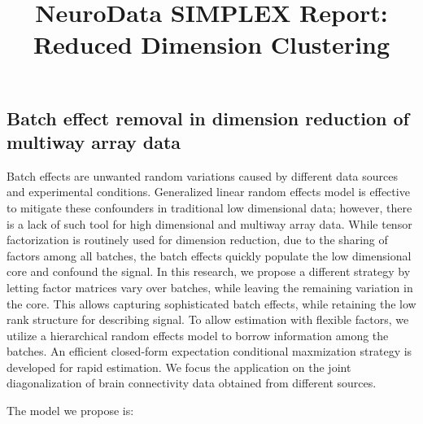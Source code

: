 \documentclass[simplex.tex]{subfiles}
\title{NeuroData SIMPLEX Report: Reduced Dimension Clustering}
\begin{document}

\subsection{Batch effect removal in dimension reduction of multiway array data}

Batch effects are unwanted random variations caused by different data sources and experimental conditions. Generalized linear random effects model is effective to mitigate these confounders in traditional low dimensional data; however, there is a lack of such tool for high dimensional and multiway array data. While tensor factorization is routinely used for dimension reduction, due to the sharing of factors among all batches, the batch effects quickly populate the low dimensional core and confound the signal. In this research, we propose a different strategy by letting factor matrices vary over batches, while leaving the remaining variation in the core. This allows capturing sophisticated batch effects, while retaining the low rank structure for describing signal. To allow estimation with flexible factors, we utilize a hierarchical random effects model to borrow information among the batches. An efficient closed-form expectation conditional maxmization strategy is developed for rapid estimation. We focus the application on the joint diagonalization of brain connectivity data obtained from different sources.

The model we propose is:
\end{document}
